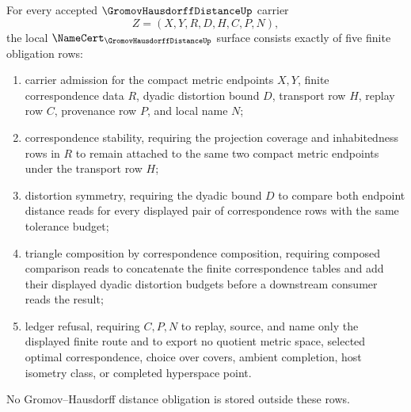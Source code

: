 \begin{theorem}
\label{thm:gromov-hausdorff-distance-namecert-obligations}
For every accepted $\GromovHausdorffDistanceUp$ carrier
$$
Z=(X,Y,R,D,H,C,P,N),
$$
the local $\NameCert_{\GromovHausdorffDistanceUp}$ surface consists exactly of five finite obligation rows:
\begin{enumerate}
\item carrier admission for the compact metric endpoints $X,Y$, finite correspondence data $R$, dyadic distortion bound $D$, transport row $H$, replay row $C$, provenance row $P$, and local name $N$;
\item correspondence stability, requiring the projection coverage and inhabitedness rows in $R$ to remain attached to the same two compact metric endpoints under the transport row $H$;
\item distortion symmetry, requiring the dyadic bound $D$ to compare both endpoint distance reads for every displayed pair of correspondence rows with the same tolerance budget;
\item triangle composition by correspondence composition, requiring composed comparison reads to concatenate the finite correspondence tables and add their displayed dyadic distortion budgets before a downstream consumer reads the result;
\item ledger refusal, requiring $C,P,N$ to replay, source, and name only the displayed finite route and to export no quotient metric space, selected optimal correspondence, choice over covers, ambient completion, host isometry class, or completed hyperspace point.
\end{enumerate}
No Gromov--Hausdorff distance obligation is stored outside these rows.
\end{theorem}
